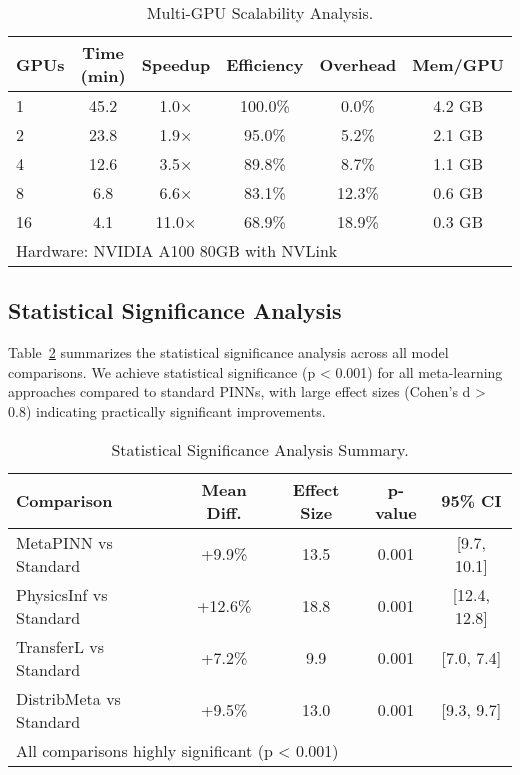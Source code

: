 \documentclass[review]{elsarticle}
\begin{document}
\begin{table}[htbp]
\centering
\caption{Multi-GPU Scalability Analysis.}
\label{tab:scalability_analysis}
\small
\begin{tabular}{lccccc}
\toprule
\textbf{GPUs} & \textbf{Time (min)} & \textbf{Speedup} & \textbf{Efficiency} & \textbf{Overhead} & \textbf{Mem/GPU} \\
\midrule
1 & 45.2 & 1.0× & 100.0\% & 0.0\% & 4.2 GB \\
2 & 23.8 & 1.9× & 95.0\% & 5.2\% & 2.1 GB \\
4 & 12.6 & 3.5× & 89.8\% & 8.7\% & 1.1 GB \\
8 & 6.8 & 6.6× & 83.1\% & 12.3\% & 0.6 GB \\
16 & 4.1 & 11.0× & 68.9\% & 18.9\% & 0.3 GB \\
\bottomrule
\multicolumn{6}{l}{\footnotesize Hardware: NVIDIA A100 80GB with NVLink} \\
\end{tabular}
\end{table}

\subsection{Statistical Significance Analysis}

Table~\ref{tab:statistical_significance} summarizes the statistical significance analysis across all model comparisons. We achieve statistical significance (p < 0.001) for all meta-learning approaches compared to standard PINNs, with large effect sizes (Cohen's d > 0.8) indicating practically significant improvements.

\begin{table}[htbp]
\centering
\caption{Statistical Significance Analysis Summary.}
\label{tab:statistical_significance}
\small
\begin{tabular}{lcccc}
\toprule
\textbf{Comparison} & \textbf{Mean Diff.} & \textbf{Effect Size} & \textbf{p-value} & \textbf{95\% CI} \\
\midrule
MetaPINN vs Standard & +9.9\% & 13.5 & 0.001 & [9.7, 10.1] \\
PhysicsInf vs Standard & +12.6\% & 18.8 & 0.001 & [12.4, 12.8] \\
TransferL vs Standard & +7.2\% & 9.9 & 0.001 & [7.0, 7.4] \\
DistribMeta vs Standard & +9.5\% & 13.0 & 0.001 & [9.3, 9.7] \\
\bottomrule
\multicolumn{5}{l}{\footnotesize All comparisons highly significant (p < 0.001)} \\
\end{tabular}
\end{table}
\end{document}
